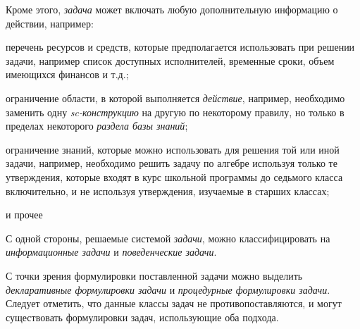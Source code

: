 \begin{SCn}
{	Кроме этого, \textit{задача} может включать любую дополнительную информацию о действии, например:
	\begin{scnitemize}
		\item перечень ресурсов и средств, которые предполагается использовать при решении задачи, например список доступных исполнителей, временные сроки, объем имеющихся финансов и т.д.;
		\item ограничение области, в которой выполняется \textit{действие}, например, необходимо заменить одну \textit{\mbox{sc-конструкцию}} на другую по некоторому правилу, но только в пределах некоторого \textit{раздела базы знаний};
		\item ограничение знаний, которые можно использовать для решения той или иной задачи, например, необходимо решить задачу по алгебре используя только те утверждения, которые входят в курс школьной программы до седьмого класса включительно, и не используя утверждения, изучаемые в старших классах;
		\item и прочее
	\end{scnitemize}
	С одной стороны, решаемые системой \textit{задачи}, можно классифицировать на \textit{информационные задачи} и \textit{поведенческие задачи}.
	
	С точки зрения формулировки поставленной задачи можно выделить \textit{декларативные формулировки задачи} и \textit{процедурные формулировки задачи}. Следует отметить, что данные классы задач не противопоставляются, и могут существовать формулировки задач, использующие оба подхода.}


\end{SCn}

